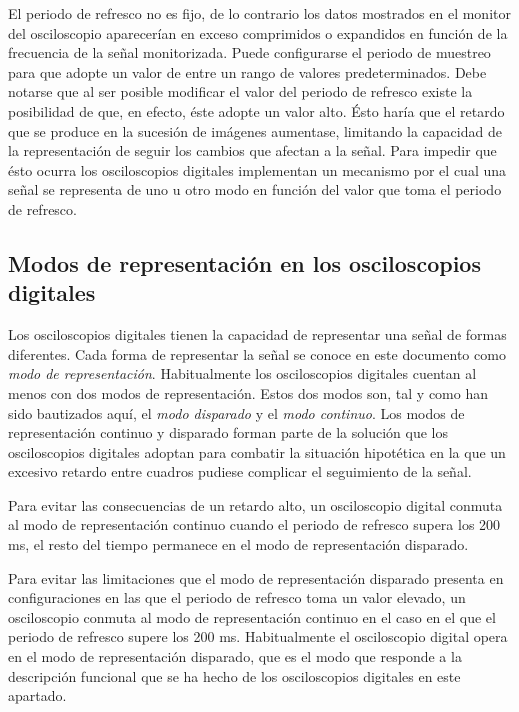 El periodo de refresco no es fijo, de lo contrario los datos mostrados en
el monitor del osciloscopio aparecerían en exceso comprimidos o expandidos
en función de la frecuencia de la señal monitorizada. Puede configurarse el
periodo de muestreo para que adopte un valor de entre un rango de valores
predeterminados. Debe notarse que al ser posible modificar el valor del
periodo de refresco existe la posibilidad de que, en efecto, éste adopte un
valor alto. Ésto haría que el retardo que se produce en la sucesión de
imágenes aumentase, limitando la capacidad de la representación de seguir
los cambios que afectan a la señal. Para impedir que ésto ocurra los
osciloscopios digitales implementan un mecanismo por el cual una señal se
representa de uno u otro modo en función del valor que toma el periodo de
refresco.


\subsection{Modos de representación en los osciloscopios digitales}\label{subsec:repmodes}

Los osciloscopios digitales tienen la capacidad de representar una señal de
formas diferentes. Cada forma de representar la señal se conoce en este
documento como \emph{modo de representación}. Habitualmente los
osciloscopios digitales cuentan al menos con dos modos de representación.
Estos dos modos son, tal y como han sido bautizados aquí, el \emph{modo
disparado} y el \emph{modo continuo}. Los modos de representación continuo
y disparado forman parte de la solución que los osciloscopios digitales
adoptan para combatir la situación hipotética en la que un excesivo retardo
entre cuadros pudiese complicar el seguimiento de la señal.

Para evitar las consecuencias de un retardo alto, un osciloscopio digital
conmuta al modo de representación continuo cuando el periodo de refresco
supera los 200 ms, el resto del tiempo permanece en el modo de
representación disparado. %

Para evitar las limitaciones que el modo de representación disparado
presenta en configuraciones en las que el periodo de refresco toma un valor
elevado, un osciloscopio conmuta al modo de representación continuo en el
caso en el que el periodo de refresco supere los 200 ms. Habitualmente el
osciloscopio digital opera en el modo de representación disparado, que es
el modo que responde a la descripción funcional que se ha hecho de los
osciloscopios digitales en este apartado.


